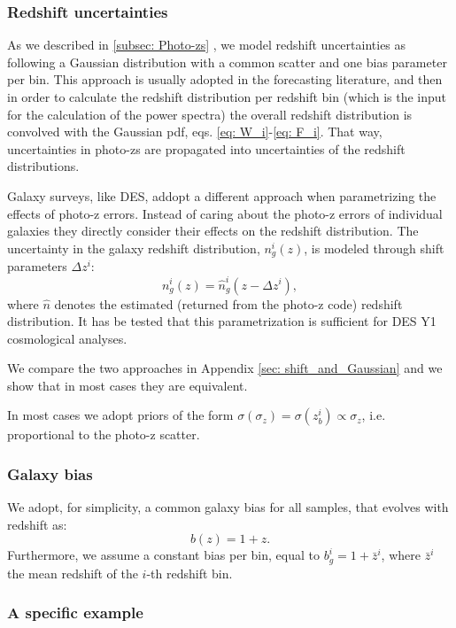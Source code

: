 \documentclass[a4paper,fleqn,usenatbib]{mnras}
\begin{document}
\subsubsection{Redshift uncertainties}

As we described in \ref{subsec: Photo-zs} , we model redshift uncertainties as  following a Gaussian distribution with a common scatter and one bias parameter per bin. This approach is usually adopted in the forecasting literature, and then in order to calculate the redshift distribution per redshift bin (which is the input for the calculation of the power spectra) the overall redshift distribution is convolved with the Gaussian pdf, eqs. \eqref{eq: W_i}-\eqref{eq: F_i}. That way, uncertainties in photo-zs are propagated into uncertainties of the redshift distributions.

Galaxy surveys, like DES, addopt a different approach when parametrizing the effects of photo-z errors. Instead of caring about the photo-z errors of individual galaxies they directly consider their effects on the redshift distribution. The uncertainty in the galaxy redshift distribution, $n_g^i(z)$, is modeled through shift parameters $\Delta z^i$:
\begin{equation}
n_g^i(z) = \hat{n}^i_g(z - \Delta z^i), 
\end{equation}
where $\hat{n}$ denotes the estimated (returned from the photo-z code) redshift distribution. It has be tested that this parametrization is sufficient for DES Y1 cosmological analyses. 

We compare the two approaches in Appendix \ref{sec: shift_and_Gaussian} and we show that in most cases they are equivalent. 

In most cases we adopt priors of the form $\sigma(\sigma_z) = \sigma(z_b^i) \propto \sigma_z$, i.e. proportional to the photo-z scatter. 

\subsubsection{Galaxy bias}

We adopt, for simplicity, a common  galaxy bias for all samples, that evolves with redshift as:
\begin{equation}
b(z) = 1 + z.
\end{equation}
Furthermore, we assume a constant bias per bin, equal to $b_g^i = 1 + \bar{z}^i$, where $\bar{z}^i$ the mean redshift of the $i$-th redshift bin.

\subsubsection{A specific example}
\end{document}
